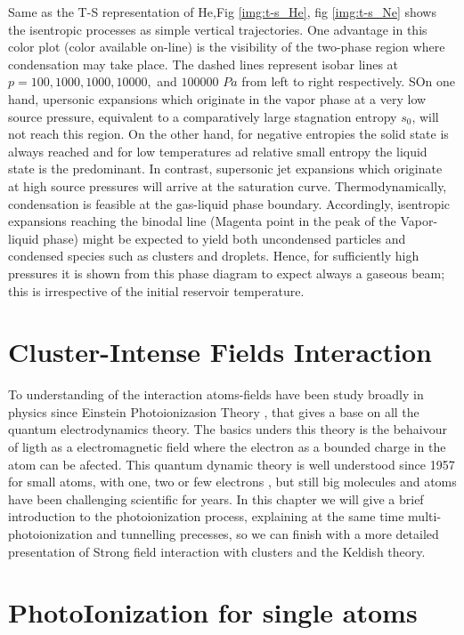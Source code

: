 Same as the T-S representation of He,Fig \ref{img:t-s_He},  fig \ref{img:t-s_Ne} shows the  isentropic processes as simple vertical trajectories. One advantage in this color plot (color available on-line) is the visibility of the two-phase region where condensation may take place. The dashed lines represent isobar lines at $p= 100,1000,1000,10000,$ and $100000$ $Pa$ from left to right respectively. SOn one hand, upersonic expansions which originate in the vapor phase at a very low source pressure, equivalent to a comparatively large stagnation entropy $s_{0}$, will not reach this region. On the other hand, for negative entropies the solid state is always reached and for  low temperatures ad relative small entropy the liquid state is the predominant. 
In contrast, supersonic jet expansions which originate at high source pressures will arrive at the saturation curve. Thermodynamically, condensation is feasible at the gas-liquid phase boundary. Accordingly, isentropic expansions reaching the binodal line (Magenta point in the peak of the Vapor-liquid phase) might be expected to yield both uncondensed particles and condensed species such as clusters and droplets.
Hence, for sufficiently high pressures it is shown from this phase diagram to expect always a gaseous beam; this is irrespective of the initial reservoir temperature.


\section{Cluster-Intense Fields  Interaction}

To understanding of the interaction atoms-fields have been study broadly in physics since Einstein Photoionizasion Theory \cite{einstein_uber_1905}, that gives a base on all the quantum electrodynamics theory. The basics unders this theory is the behaivour of ligth as a electromagnetic field where the electron as a bounded charge in the atom can be afected.  This quantum dynamic theory is well understood since 1957 for small atoms, with one, two or few electrons \cite{a._bethe_quantum_1957}, but still big molecules and atoms have been challenging scientific for years. In this chapter we will give a brief introduction to the photoionization process, explaining at the same time multi-photoionization and tunnelling precesses, so we can finish with a more detailed presentation of Strong field interaction with clusters and the Keldish theory.


\section{PhotoIonization for single atoms}

